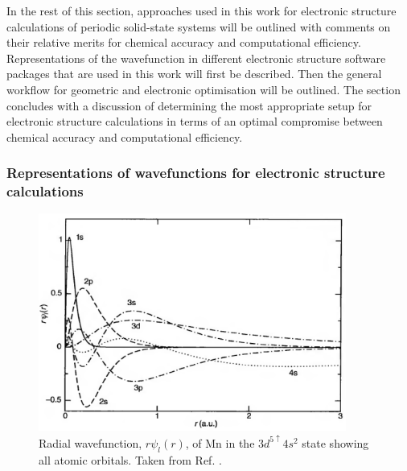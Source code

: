 \documentclass[11pt, twoside]{report}
\begin{document}
In the rest of this section, approaches used in this work for electronic structure calculations of periodic solid-state systems will be outlined with comments on their relative merits for chemical accuracy and computational efficiency. Representations of the wavefunction in different electronic structure software packages that are used in this work will first be described. Then the general workflow for geometric and electronic optimisation will be outlined. The section concludes with a discussion of determining the most appropriate setup for electronic structure calculations in terms of an optimal compromise between chemical accuracy and computational efficiency.



\subsubsection{Representations of wavefunctions for electronic structure calculations}
\begin{figure}[h!]
  \centering
    \includegraphics[width=0.9\textwidth]{figures/atomic_radial_wavefunction.png}
    \caption{Radial wavefunction, $r\psi_l(r)$, of Mn in the $3d^{5\uparrow}4s^2$ state showing all atomic orbitals. Taken from Ref. .}
  \label{atomic_radial_wavefunction}
\end{figure}

\end{document}
